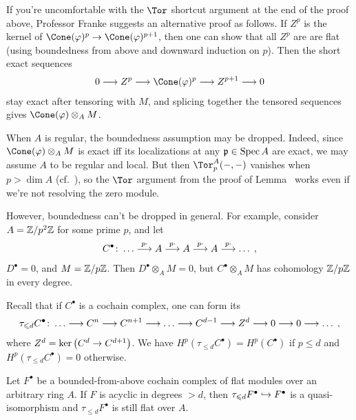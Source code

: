 \documentclass[a4paper,parskip=half,numbers=enddot, DIV=12]{scrreprt}
\renewcommand{\leq}{\leqslant}
\begin{document}
\begin{rem}
	\begin{alphanumerate}
		\item{} If you're uncomfortable with the $\Tor$ shortcut argument at the end of the proof above, Professor Franke suggests an alternative proof as follows. If $Z^p$ is the kernel of $\Cone(\phi)^p\morphism\Cone(\phi)^{p+1}$, then one can show that all $Z^p$ are are flat (using boundedness from above and downward induction on $p$). Then the short exact sequences
		\begin{align*}
			0\morphism Z^p\morphism \Cone(\phi)^p\morphism Z^{p+1}\morphism 0
		\end{align*}
		stay exact after tensoring with $M$, and splicing together the tensored sequences gives $\Cone(\phi)\otimes_AM$.
		\item When $A$ is regular, the boundedness assumption may be dropped. Indeed, since $\Cone(\phi)\otimes_AM$ is exact iff its localizations at any $\mathfrak{p}\in\operatorname{Spec} A$ are exact, we may assume $A$ to be regular and local. But then $\Tor_p^A(-,-)$ vanishes when $p>\dim A$ (cf.\ \cite[Theorem~1]{homalg}), so the $\Tor$ argument from the proof of Lemma~ works even if we're not resolving the zero module.
		
		However, boundedness can't be dropped in general. For example, consider $A=\mathbb{Z}/p^2\mathbb{Z}$ for some prime $p$, and let
		\begin{align*}
			C^\bullet\colon \ldots\morphism[ p\cdot]A\morphism[ p\cdot]A\morphism[ p\cdot]A\morphism[ p\cdot]\ldots\;,
		\end{align*}
		$D^\bullet=0$, and $M=\mathbb{Z}/p\mathbb{Z}$. Then $D^\bullet\otimes_AM=0$, but $C^\bullet\otimes_AM$ has cohomology $\mathbb{Z}/p\mathbb{Z}$ in every degree.
	\end{alphanumerate}
\end{rem}
Recall that if $C^\bullet$ is a cochain complex, one can form its 
\begin{align*}
	\tau_{\leq d}C^\bullet\colon \ldots\morphism C^n\morphism C^{n+1}\morphism \ldots \morphism C^{d-1}\morphism Z^d\morphism 0\morphism 0\morphism \ldots\;,
\end{align*} 
where $Z^d=\ker\left(C^{d}\morphism C^{d+1}\right)$. We have $H^p(\tau_{\leq d}C^\bullet)=H^p(C^\bullet)$ if $p\leq d$ and $H^p(\tau_{\leq d}C^\bullet)=0$ otherwise.
\begin{lem}
	Let $F^\bullet$ be a bounded-from-above cochain complex of flat modules over an arbitrary ring $A$. If $F$ is acyclic in degrees $>d$, then $\tau_{\leq d}F^\bullet\monomorphism F^\bullet$ is a quasi-isomorphism and $\tau_{\leq d}F^\bullet$ is still flat over $A$.
\end{lem}
\end{document}

